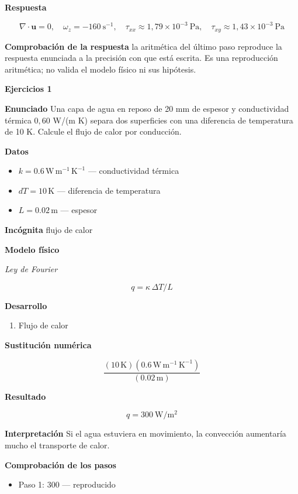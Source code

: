 \documentclass[10pt,openany]{book}
\begin{document}
\noindent\textbf{Respuesta}

\[
\nabla\cdot\mathbf{u} = 0,\quad \omega_z = -160\ \mathrm{s^{-1}},\quad \tau_{xx} \approx 1{,}79\times 10^{-3}\ \mathrm{Pa},\quad \tau_{xy} \approx 1{,}43\times 10^{-3}\ \mathrm{Pa}
\]

\noindent\textbf{Comprobación de la respuesta} la aritmética del último paso reproduce la respuesta enunciada a la precisión con que está escrita. Es una reproducción aritmética; no valida el modelo físico ni sus hipótesis.

\noindent\textbf{Ejercicios 1}

\noindent\textbf{Enunciado}
Una capa de agua en reposo de 20 mm de espesor y conductividad térmica \(0{,}60\) W/(m K) separa dos superficies con una diferencia de temperatura de 10 K. Calcule el flujo de calor por conducción.

\noindent\textbf{Datos}
\begin{itemize}
\item $k = 0.6\,\mathrm{W}\,\mathrm{m}^{-1}\,\mathrm{K}^{-1}$ — conductividad térmica
\item $dT = 10\,\mathrm{K}$ — diferencia de temperatura
\item $L = 0.02\,\mathrm{m}$ — espesor
\end{itemize}

\noindent\textbf{Incógnita}
flujo de calor

\noindent\textbf{Modelo físico}

\noindent\textit{Ley de Fourier}

\[
q = \kappa\,\Delta T/L
\]

\noindent\textbf{Desarrollo}
\begin{enumerate}
\item
Flujo de calor
\end{enumerate}

\noindent\textbf{Sustitución numérica}

\[
\frac{\left(10\,\mathrm{K}\right) \left(0.6\,\mathrm{W}\,\mathrm{m}^{-1}\,\mathrm{K}^{-1}\right)}{\left(0.02\,\mathrm{m}\right)}
\]

\noindent\textbf{Resultado}

\[
q = 300\ \mathrm{W/m^{2}}
\]

\noindent\textbf{Interpretación}
Si el agua estuviera en movimiento, la convección aumentaría mucho el transporte de calor.

\noindent\textbf{Comprobación de los pasos}
\begin{itemize}
\item Paso 1: $300$ — reproducido
\end{itemize}
\end{document}
